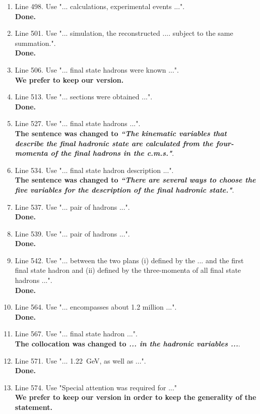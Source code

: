 \documentclass[,superscriptaddress,showpacs,amssymb,amsmath,amsfonts,linenumbers,article]{revtex4-1}
\begin{document}
\begin{itemize}
\begin{enumerate}
\item Line 498. Use "... calculations, experimental events ...".\\
{\bf Done.}
\item Line 501. Use "... simulation, the reconstructed .... subject to the same summation.".\\
{\bf Done.}
\item Line 506. Use "... final state hadrons were known ...".\\
{\bf We prefer to keep our version.}
\item Line 513. Use "... sections were obtained ...".\\
{\bf Done.}
\item Line 527. Use "... final state hadrons ...".\\
{\bf The sentence was changed to {\it ``The kinematic variables that describe the final hadronic state are calculated from the four-momenta of the final hadrons in the c.m.s."}}.
\item Line 534. Use "... final state hadron description ...".\\
{\bf The sentence was changed to {\it ``There are several ways to choose the five variables for the description of the final hadronic state."}}.
\item Line 537. Use "... pair of hadrons ...".\\
{\bf Done.}
\item Line 539. Use "... pair of hadrons ...".\\
{\bf Done.}
\item Line 542. Use "... between the two plans (i) defined by the ... and the first final state hadron and (ii) defined by the three-momenta of all final state  hadrons ...".\\
{\bf Done.}
\item Line 564. Use "... encompasses about 1.2 million ...".\\
{\bf Done.}
\item Line 567. Use "... final state hadron ...".\\
{\bf The collocation was changed to {\it ... in the hadronic variables ...}}.
\item Line 571. Use "... 1.22~GeV, as well as ...".\\
{\bf Done.}
\item Line 574. Use "Special attention was required for ..."\\
{\bf We prefer to keep our version in order to keep the generality of the statement.} 
 

\end{enumerate}
\end{itemize}
\end{document}
